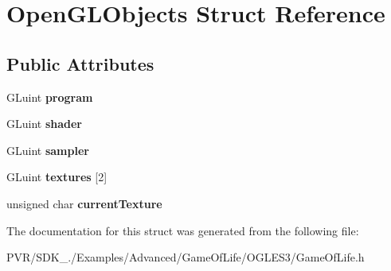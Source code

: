 \hypertarget{struct_open_g_l_objects}{\section{Open\+G\+L\+Objects Struct Reference}
\label{struct_open_g_l_objects}
}
\subsection*{Public Attributes}
\begin{DoxyCompactItemize}
\item 
\hypertarget{struct_open_g_l_objects_addceb827370f7cc772b602daa727f62e}{G\+Luint {\bfseries program}}\label{struct_open_g_l_objects_addceb827370f7cc772b602daa727f62e}

\item 
\hypertarget{struct_open_g_l_objects_a0083cb7962527242d06a0529e89cd361}{G\+Luint {\bfseries shader}}\label{struct_open_g_l_objects_a0083cb7962527242d06a0529e89cd361}

\item 
\hypertarget{struct_open_g_l_objects_a2bfe19b37d60870ff3f0c0d1a4068496}{G\+Luint {\bfseries sampler}}\label{struct_open_g_l_objects_a2bfe19b37d60870ff3f0c0d1a4068496}

\item 
\hypertarget{struct_open_g_l_objects_a6876e211d593744c5ed1916d90291866}{G\+Luint {\bfseries textures} \mbox{[}2\mbox{]}}\label{struct_open_g_l_objects_a6876e211d593744c5ed1916d90291866}

\item 
\hypertarget{struct_open_g_l_objects_a01b5f3775164f24d0d136d3e80438b4e}{unsigned char {\bfseries current\+Texture}}\label{struct_open_g_l_objects_a01b5f3775164f24d0d136d3e80438b4e}

\end{DoxyCompactItemize}


The documentation for this struct was generated from the following file\+:\begin{DoxyCompactItemize}
\item 
P\+V\+R/\+S\+D\+K\+\_./\+Examples/\+Advanced/\+Game\+Of\+Life/\+O\+G\+L\+E\+S3/Game\+Of\+Life.\+h\end{DoxyCompactItemize}
